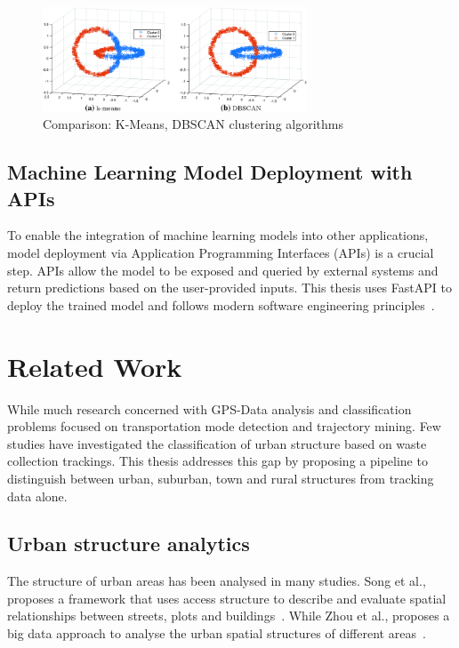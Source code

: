 \documentclass[a4paper,12pt,twoside]{scrreprt}
\begin{document}
\begin{figure}[htbp]
  \centering

  \includegraphics[width=0.7\textwidth]{Figures/background/k-means-and-DBSCAN-clustering-results-on-Chainlink-data-set.png}
  \caption{Comparison: K-Means, DBSCAN clustering algorithms
    \cite{liang_graph-based_2024}}
  \label{fig:dbscan_against_k-means}
\end{figure}
\FloatBarrier

\subsection{Machine Learning Model Deployment with APIs}

To enable the integration of machine learning models into other applications,
model deployment via Application Programming Interfaces (APIs) is a crucial
step.
APIs allow the model to be exposed and queried by external systems and return
predictions based on the user-provided inputs.
This thesis uses FastAPI to deploy the trained model and follows modern
software engineering
principles~\cite{voron_building_2023,noauthor_deploying_nodate}.

\section{Related Work}
While much research concerned with GPS-Data analysis and classification
problems
focused on transportation mode detection and trajectory mining. Few studies
have investigated the classification of urban structure
based on waste collection trackings.
This thesis addresses this gap by proposing a pipeline to distinguish between
urban, suburban, town and rural structures from tracking data alone.

\subsection{Urban structure analytics}
The structure of urban areas has been analysed in many studies.
Song et al., proposes a framework that uses access structure to describe and
evaluate spatial relationships between streets, plots and
buildings~\cite{song_access_2021}. While Zhou et al., proposes a big data
approach to
analyse the urban spatial structures of different
areas~\cite{zhou_research_2022}.
\end{document}
